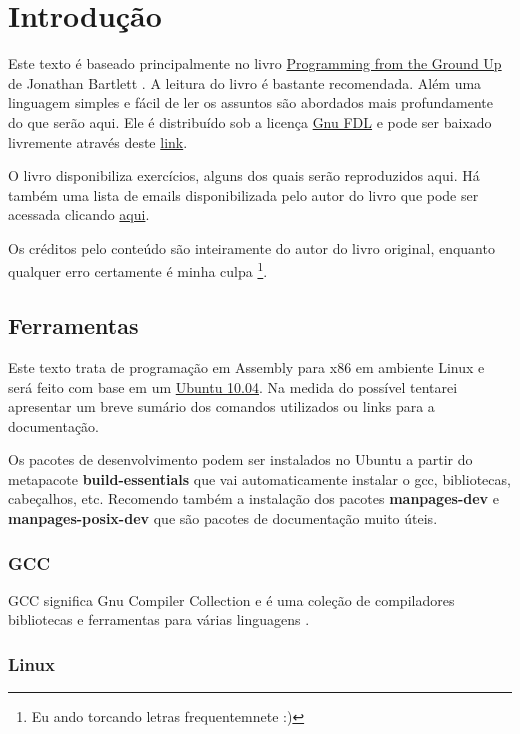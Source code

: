 \chapter{Introdução}

Este texto é baseado principalmente no livro \href{http://savannah.nongnu.org/projects/pgubook}{Programming from the Ground Up} de Jonathan Bartlett \cite{Bartlett}. A leitura do livro é bastante recomendada. Além uma linguagem simples e fácil de ler os assuntos são abordados mais profundamente do que serão aqui. Ele é distribuído sob a licença \href{http://www.gnu.org/licenses/fdl.html}{Gnu FDL} \cite{Gfdl} e pode ser baixado livremente através deste \href{http://savannah.nongnu.org/projects/pgubook}{link}.

O livro disponibiliza exercícios, alguns dos quais serão reproduzidos aqui. Há também uma lista de emails disponibilizada pelo autor do livro que pode ser acessada clicando \href{http://mail.nongnu.org/mailman/listinfo/pgubook-readers}{aqui}.

Os créditos pelo conteúdo são inteiramente do autor do livro original, enquanto qualquer erro certamente é minha culpa \footnote{Eu ando torcando letras frequentemnete :)}.

\section{Ferramentas}

Este texto trata de programação em Assembly para x86 em ambiente Linux e será feito com base em um \href{http://www.ubuntu.com}{Ubuntu 10.04}. Na medida do possível tentarei apresentar um breve sumário dos comandos utilizados ou links para a documentação.

Os pacotes de desenvolvimento podem ser instalados no Ubuntu a partir do metapacote \textbf{build-essentials} que vai automaticamente instalar o gcc, bibliotecas, cabeçalhos, etc. Recomendo também a instalação dos pacotes \textbf{manpages-dev} e \textbf{manpages-posix-dev} que são pacotes de documentação muito úteis.

\subsection{GCC}

GCC significa Gnu Compiler Collection e é uma coleção de compiladores bibliotecas e ferramentas para várias linguagens \cite{Gcc}.

\subsection{Linux}

